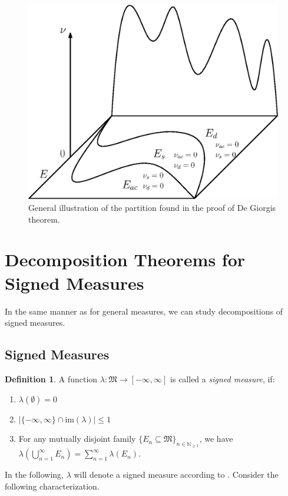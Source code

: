 \documentclass[10pt, leqno]{amsart}
\theoremstyle{definition}
\newtheorem{definition}{Definition}[section]
\theoremstyle{remark}
\begin{document}
    \begin{figure}[!hbtp]
        \centering
        \includegraphics[width=0.4\linewidth]{img/degiorgi2.eps}
        \caption{General illustration of the partition found in the proof of De Giorgis theorem.}
        \label{fig:degiorgi_decomposition_illustration_2}
    \end{figure}

    \section{Decomposition Theorems for Signed Measures}

    In the same manner as for general measures, we can study decompositions of signed measures.

    \subsection{Signed Measures}

    \begin{definition} \label{def:signed_measures}
        A function \(\lambda\colon \mathfrak{M} \to [-\infty, \infty]\) is called a \emph{signed measure}, if:
        \begin{enumerate}[label=(\roman*)]
            \item \(\lambda(\emptyset) = 0\)
            \item \(|\{-\infty, \infty\} \cap \text{im}(\lambda)| \leq 1\)
            \item For any mutually disjoint family \(\{E_n \subseteq \mathfrak{M}\}_{n \in \mathbb{N}_{\geq 1}}\), we have \(\lambda\left(\bigcup_{n=1}^\infty E_n\right) = \sum_{n=1}^\infty \lambda(E_n)\).
        \end{enumerate}
    \end{definition}

    In the following, \(\lambda\) will denote a signed measure according to . Consider the following characterization.
\end{document}
